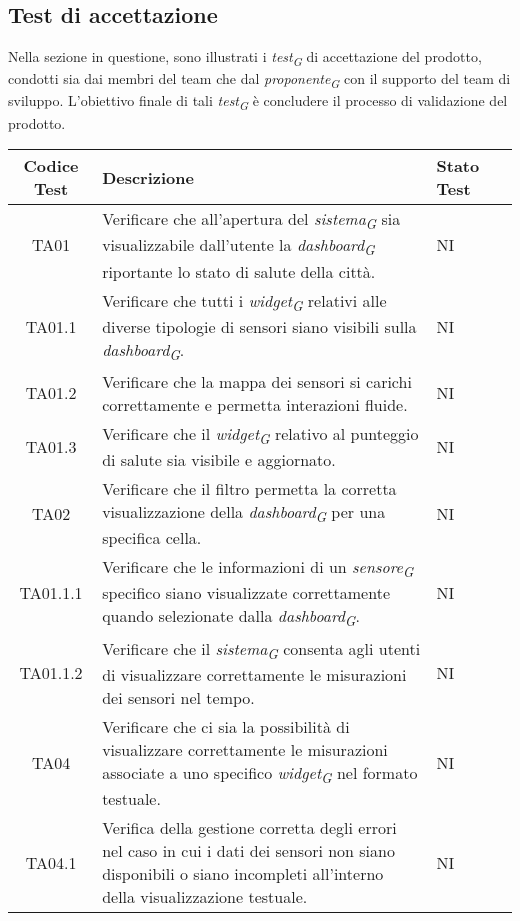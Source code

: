 \subsection{Test di accettazione}
Nella sezione in questione, sono illustrati i \textit{test}\textsubscript{\textit{G}} di accettazione del prodotto, condotti sia dai membri del team che dal \textit{proponente}\textsubscript{\textit{G}} con il supporto del team di sviluppo. L'obiettivo finale di tali \textit{test}\textsubscript{\textit{G}} è concludere il processo di validazione del prodotto.
\\
\begin{longtable}{|c|p{5cm}|p{2cm}|c|}
    \hline
    Codice Test & Descrizione & Stato Test \\
    \hline
    TA01 & Verificare che all'apertura del \textit{sistema}\textsubscript{\textit{G}} sia visualizzabile dall'utente la \textit{dashboard}\textsubscript{\textit{G}} riportante lo stato di salute della città. & NI \\
    \hline
    TA01.1 & Verificare che tutti i \textit{widget}\textsubscript{\textit{G}} relativi alle diverse tipologie di sensori siano visibili sulla \textit{dashboard}\textsubscript{\textit{G}}. & NI \\
    \hline
    TA01.2 & Verificare che la mappa dei sensori si carichi correttamente e permetta interazioni fluide. & NI \\
    \hline
    TA01.3 & Verificare che il \textit{widget}\textsubscript{\textit{G}} relativo al punteggio di salute sia visibile e aggiornato. & NI \\
    \hline
    TA02 & Verificare che il filtro permetta la corretta visualizzazione della \textit{dashboard}\textsubscript{\textit{G}} per una specifica cella. & NI \\
    \hline
    TA01.1.1 & Verificare che le informazioni di un \textit{sensore}\textsubscript{\textit{G}} specifico siano visualizzate correttamente quando selezionate dalla \textit{dashboard}\textsubscript{\textit{G}}. & NI \\
    \hline
    TA01.1.2 & Verificare che il \textit{sistema}\textsubscript{\textit{G}} consenta agli utenti di visualizzare correttamente le misurazioni dei sensori nel tempo. & NI \\
    \hline
    TA04 & Verificare che ci sia la possibilità di visualizzare correttamente le misurazioni associate a uno specifico \textit{widget}\textsubscript{\textit{G}} nel formato testuale.  & NI \\
    \hline
    TA04.1 & Verifica della gestione corretta degli errori nel caso in cui i dati dei sensori non siano disponibili o siano incompleti all'interno della visualizzazione testuale. & NI \\

\end{longtable}
